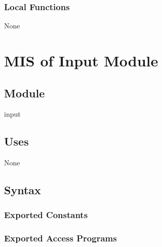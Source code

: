 \documentclass[12pt, titlepage]{article}
\begin{document}
%

\subsubsection{Local Functions}

None
\newpage

\section{MIS of Input Module} \label{mInput}

\subsection{Module}

input

\subsection{Uses}
None

\subsection{Syntax}

\subsubsection{Exported Constants}

\subsubsection{Exported Access Programs}
\end{document}
